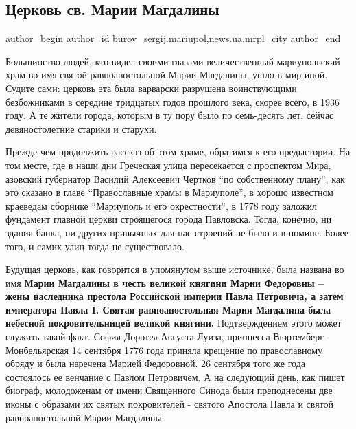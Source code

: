  
 
 
 
 
 
\subsection{Церковь св. Марии Магдалины}
\label{sec:07_04_2018.stz.news.ua.mrpl_city.1.cerkov_cv_marii_magdaliny}
 
\ifcmt
 author_begin
   author_id burov_sergij.mariupol,news.ua.mrpl_city
 author_end
\fi

Большинство людей, кто видел своими глазами величественный мариупольский храм
во имя святой равноапостольной Марии Магдалины, ушло в мир иной. Судите сами:
церковь эта была варварски разрушена воинствующими безбожниками в середине
тридцатых годов прошлого века, скорее всего, в 1936 году. А те жители города,
которым в ту пору было по семь-десять лет, сейчас девяностолетние старики и
старухи.

Прежде чем продолжить рассказ об этом храме, обратимся к его предыстории. На
том месте, где в наши дни Греческая улица пересекается с проспектом Мира,
азовский губернатор Василий Алексеевич Чертков \enquote{по собственному плану}, как это
сказано в главе \enquote{Православные храмы в Мариуполе}, в хорошо известном краеведам
сборнике \enquote{Мариуполь и его окрестности}, в 1778 году заложил фундамент главной
церкви строящегося города Павловска. Тогда, конечно, ни здания банка, ни других
привычных для нас строений не было и в помине. Более того, и самих улиц тогда
не существовало.


Будущая церковь, как говорится в упомянутом выше источнике, была названа во имя
\textbf{Марии Магдалины в честь великой княгини Марии Федоровны – жены наследника
престола Российской империи Павла Петровича, а затем императора Павла I. Святая
равноапостольная Мария Магдалина была  небесной покровительницей великой
княгини.} Подтверждением этого может служить такой факт.
София-Доротея-Августа-Луиза, принцесса Вюртемберг-Монбельярская 14 сентября
1776 года приняла крещение по православному обряду и была наречена Марией
Федоровной. 26 сентября того же года состоялось ее венчание с Павлом
Петровичем. А на следующий день, как пишет биограф, молодоженам от имени
Священного Синода были преподнесены две иконы с образами их святых покровителей
- святого Апостола Павла и святой равноапостольной Марии Магдалины. 

